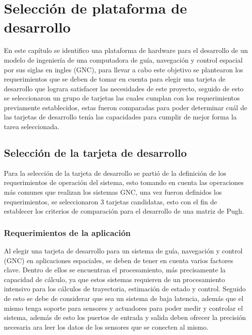 \chapter{Selección de plataforma de desarrollo}
\label{ch:especifico1}

En este capítulo se identifico una plataforma de hardware para el desarrollo de un modelo de ingeniería de una computadora de guía, navegación y control espacial por sus siglas en ingles (GNC), para llevar a cabo este objetivo se plantearon los requerimientos que se deben de tomar en cuenta para elegir una tarjeta de desarrollo que lograra satisfacer las necesidades de este proyecto, seguido de esto se seleccionaron un grupo de tarjetas las cuales cumplan con los requerimientos previamente establecidos, estas fueron comparadas para poder determinar cuál de las tarjetas de desarrollo tenía las capacidades para cumplir de mejor forma la tarea seleccionada.

\section{Selección de la tarjeta de desarrollo}
    Para la selección de la tarjeta de desarrollo se partió de la definición de los requerimientos de operación del sistema, esto tomando en cuenta las operaciones más comunes que realizan los sistemas GNC, una vez fueron definidos los requerimientos, se seleccionaron 3 tarjetas candidatas, esto con el fin de establecer los criterios de comparación para el desarrollo de una matriz de Pugh.

\subsection{Requerimientos de la aplicación}

Al elegir una tarjeta de desarrollo para un sistema de guía, navegación y control (GNC) en aplicaciones espaciales, se deben de tener en cuenta varios factores clave. Dentro de ellos se encuentran el procesamiento, más precisamente la capacidad de cálculo, ya que estos sistemas requieren de un procesamiento intensivo para los cálculos de trayectoria, estimación de estado y control. Seguido de esto se debe de considerar que sea un sistema de baja latencia, además que el mismo tenga soporte para sensores y actuadores para poder medir y controlar el sistema, además de esto los puertos de entrada y salida deben ofrecer la precisión necesaria ara leer los datos de los sensores que se conecten al mismo.

